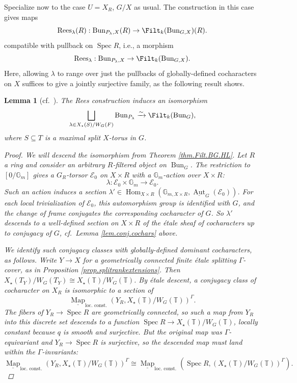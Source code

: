 \documentclass[openany]{amsbook}
\newtheorem{lemma}[theorem]{Lemma}
\theoremstyle{definition}
\theoremstyle{remark}
\numberwithin{equation}{section}
\newcommand{\G}{\mathbb{G}}
\newcommand{\T}{\mathbb{T}}
\newcommand{\cE}{\mathcal{E}}
\newcommand{\ul}[1]{\underline{#1}}
\renewcommand{\-}{\operatorname{-}}
\newcommand{\Hom}{\operatorname{Hom}}
\newcommand{\Spec}{\operatorname{Spec}}
\newcommand{\Aut}{\operatorname{Aut}}
\newcommand{\Map}{\ul{\operatorname{Map}}}
\newcommand{\on}[1]{\operatorname{#1}}
\newcommand{\Bun}{\on{Bun}}
\begin{document}
Specialize now to the case $U = X_R$, $G/X$ as usual. The construction in this case gives maps 
$$
    \on{Rees}_\lambda(R) : \Bun_{P_{\lambda},X}(R) \to \Filt_k(\Bun_{G,X})(R).
$$
compatible with pullback on $\Spec R$, i.e., a morphism
$$
    \on{Rees}_\lambda : \Bun_{P_{\lambda},X} \to \Filt_k(\Bun_{G,X}).
$$
Here, allowing $\lambda$ to range over just the pullbacks of globally-defined cocharacters on $X$ suffices to give a jointly surjective family, as the following result shows.




\begin{lemma}[{cf.\ \cite[Prop.\ 1.13, Lemma 3.9]{HeinlothGIT}}]\label{lem.Rees.BunG}
    The Rees construction induces an isomorphism
    $$
        \bigsqcup_{\lambda \in X_\star(S)/W_G(F)} \Bun_{P_\lambda} \xrightarrow{\sim} \Filt_k(\Bun_G),
    $$
    where $S \subseteq T$ is a maximal split $X$-torus in $G$.
    \begin{proof}
        We will descend the isomorphism from Theorem \ref{thm.Filt.BG.HL}. Let $R$ a ring and consider an arbitrary $R$-filtered object on $\Bun_G$. The restriction to $[0/\G_m]$ gives a $G_R$-torsor $\cE_0$ on $X \times R$ with a $\G_m$-action over $X \times R$:
    $$
        \lambda : \cE_0 \times \G_m \to \cE_0.
    $$
    Such an action induces a section $\lambda' \in \Hom_{X \times R}(\G_{m, X\times R}, \ul{\Aut}_G(\cE_0))$. For each local trivialization of $\cE_0$, this automorphism group is identified with $G$, and the change of frame conjugates the corresponding cocharacter of $G$. So $\lambda'$ descends to a well-defined section on $X \times R$ of the \'etale sheaf of cocharacters up to conjugacy of $G$, cf.\ Lemma \ref{lem.conj.cochars} above. 

    We identify such conjugacy classes with globally-defined dominant cocharacters, as follows. Write $Y \to X$ for a geometrically connected finite \'etale splitting $\Gamma$-cover, as in Proposition \ref{prop.splitrankextensions}. Then $X_\star(T_Y)/W_G(T_Y) \cong X_\star(\T)/W_G(\T)$. By \'etale descent, a conjugacy class of cocharacter on $X_R$ is isomorphic to a section of 
    $$
        \Map_{\text{loc.\ const.}}(Y_R, X_\star(\T)/W_G(\T))^{\Gamma}.
    $$
    The fibers of $Y_R \to \Spec R$ are geometrically connected, so such a map from $Y_R$ into this discrete set descends to a function $\Spec R \to X_\star(\T)/W_G(\T)$, locally constant because $q$ is smooth and surjective. But the original map was $\Gamma$-equivariant and $Y_R \to \Spec R$ is surjective, so the descended map must land within the $\Gamma$-invariants:
    $$
        \Map_{\text{loc.\ const.}}(Y_R, X_\star(\T)/W_G(\T))^{\Gamma} \cong \Map_{\text{loc.\ const.}}(\Spec R, (X_\star(\T)/W_G(\T))^{\Gamma}).
    $$
    

\end{proof}
\end{lemma}
\end{document}
